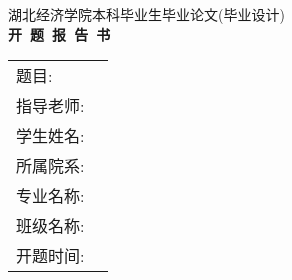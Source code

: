 \pagestyle{empty}
\newcommand{\ulbox}[1]{\ul{\makebox[10cm]{#1}}}

\begin{center}
	\renewcommand{\baselinestretch}{3.5}
	{\xiaoer\heiti 湖北经济学院本科毕业生毕业论文\-(毕业设计)} \\[1cm]
	{\chuhao\bfseries 开~题~报~告~书} \\[5cm]

	\sanhao
	\begin{tabular}{lc} 
		题\qquad 目:& \ulbox{\kaiti\stitle}  \\ 
		指导老师:& \ulbox{\kaiti\smentorn\-(\smentort)} \\
		学生姓名:& \ulbox{\kaiti\sauthor} \\
		所属院系:& \ulbox{\kaiti\sinfos} \\
		专业名称:& \ulbox{\kaiti\sinfop} \\
		班级名称:& \ulbox{\kaiti\sinfoc} \\
		开题时间:& \ulbox{\kaiti\sreporttime} \\	
	\end{tabular}
\end{center}
	\renewcommand{\baselinestretch}{1.5}

\newpage


